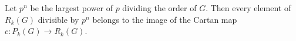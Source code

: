 Let $p^n$ be the largest power of $p$ dividing the order of $G$. Then every element of $R_k(G)$ divisible by $p^n$ belongs to the image of the Cartan map $c: P_k(G) \to R_k(G)$.
